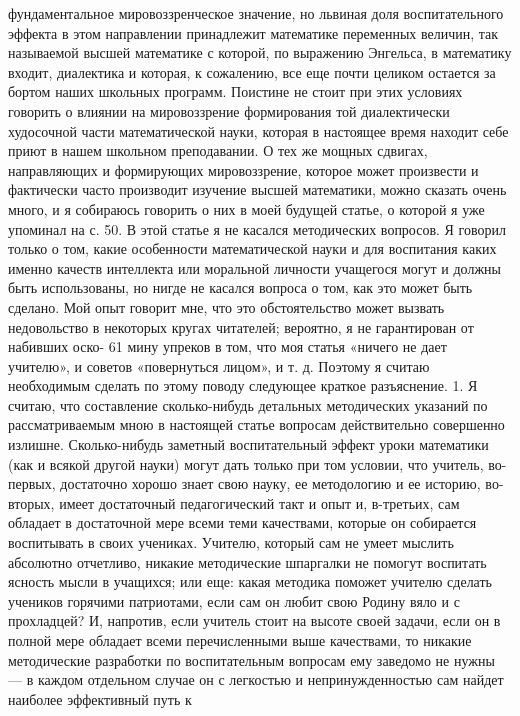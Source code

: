 \documentclass[12pt, a4paper, openany]{book}
\begin{document}
фундаментальное мировоззренческое значение, но львиная доля 
воспитательного эффекта в этом направлении  
принадлежит математике переменных величин, так называемой 
высшей математике с которой, по выражению Энгельса, 
в математику входит, диалектика и которая, к сожалению, 
все еще почти целиком остается за бортом наших школьных 
программ. Поистине не стоит при этих условиях говорить 
о влиянии на мировоззрение формирования той  
диалектически худосочной части математической науки, которая 
в настоящее время находит себе приют в нашем школьном 
преподавании. О тех же мощных сдвигах, направляющих 
и формирующих мировоззрение, которое может произвести 
и фактически часто производит изучение высшей  
математики, можно сказать очень много, и я собираюсь говорить 
о них в моей будущей статье, о которой я уже упоминал 
на с. 50. 
В этой статье я не касался методических вопросов. 
Я говорил только о том, какие особенности математической 
науки и для воспитания каких именно качеств интеллекта 
или моральной личности учащегося могут и должны быть 
использованы, но нигде не касался вопроса о том, как это 
может быть сделано. Мой опыт говорит мне, что это  
обстоятельство может вызвать недовольство в некоторых кругах 
читателей; вероятно, я не гарантирован от набивших оско- 
61 
мину упреков в том, что моя статья «ничего не дает  
учителю», и советов «повернуться лицом», и т. д. 
Поэтому я считаю необходимым сделать по этому 
поводу следующее краткое разъяснение. 
1. Я считаю, что составление сколько-нибудь  
детальных методических указаний по рассматриваемым мною 
в настоящей статье вопросам действительно совершенно 
излишне. Сколько-нибудь заметный воспитательный  
эффект уроки математики (как и всякой другой науки) могут 
дать только при том условии, что учитель, во-первых, 
достаточно хорошо знает свою науку, ее методологию и ее 
историю, во-вторых, имеет достаточный педагогический 
такт и опыт и, в-третьих, сам обладает в достаточной мере 
всеми теми качествами, которые он собирается  
воспитывать в своих учениках. Учителю, который сам не умеет 
мыслить абсолютно отчетливо, никакие методические  
шпаргалки не помогут воспитать ясность мысли в учащихся; 
или еще: какая методика поможет учителю сделать  
учеников горячими патриотами, если сам он любит свою Родину 
вяло и с прохладцей? 
И, напротив, если учитель стоит на высоте своей задачи, 
если он в полной мере обладает всеми перечисленными 
выше качествами, то никакие методические разработки 
по воспитательным вопросам ему заведомо не нужны — 
в каждом отдельном случае он с легкостью и  
непринужденностью сам найдет наиболее эффективный путь к  
\end{document}
